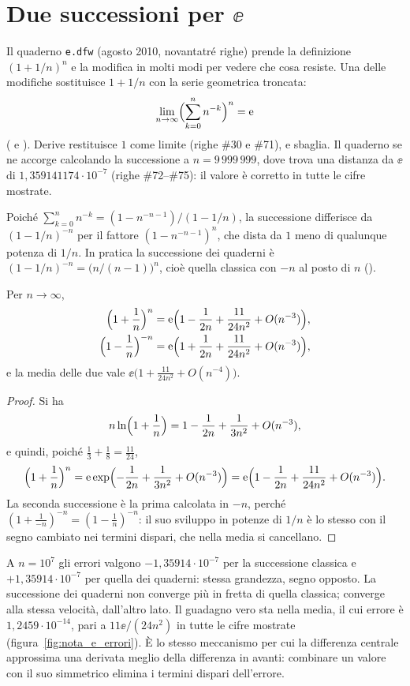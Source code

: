 \section{Due successioni per \texorpdfstring{$\ee$}{e}}
\label{sec:e}

Il quaderno \texttt{e.dfw} (agosto 2010, novantatr\'e righe) prende la
definizione $(1+1/n)^n$ e la modifica in molti modi per vedere che cosa
resiste. Una delle modifiche sostituisce $1+1/n$ con la serie geometrica
troncata:
\[
  \lim_{n\to\infty}\Bigl(\sum_{k=0}^{n}n^{-k}\Bigr)^{n}=\mathrm{e}
\]
( e ). Derive restituisce $1$ come
limite (righe \#30 e \#71), e sbaglia. Il quaderno se ne accorge calcolando
la successione a $n=9\,999\,999$, dove trova una distanza da $\ee$ di
$1{,}359141174\cdot10^{-7}$ (righe \#72--\#75): il valore \`e corretto in
tutte le cifre mostrate.

Poich\'e $\sum_{k=0}^{n}n^{-k}=(1-n^{-n-1})/(1-1/n)$, la successione differisce
da $(1-1/n)^{-n}$ per il fattore $(1-n^{-n-1})^n$, che dista da $1$ meno di
qualunque potenza di $1/n$. In pratica la successione dei quaderni \`e
$(1-1/n)^{-n}=\bigl(n/(n-1)\bigr)^n$, cio\`e quella classica con $-n$ al posto
di $n$ ().

\begin{prop}\label{prop:e}
Per $n\to\infty$,
\begin{align*}
  \Bigl(1+\frac1n\Bigr)^{n}&=\mathrm{e}\Bigl(1-\frac{1}{2n}+\frac{11}{24n^2}+O(n^{-3})\Bigr),\\
  \Bigl(1-\frac1n\Bigr)^{-n}&=\mathrm{e}\Bigl(1+\frac{1}{2n}+\frac{11}{24n^2}+O(n^{-3})\Bigr),
\end{align*}
e la media delle due vale $\ee\bigl(1+\frac{11}{24n^2}+O(n^{-4})\bigr)$.
\end{prop}

\begin{proof}
Si ha
\[
  n\ln\Bigl(1+\frac1n\Bigr)=1-\frac{1}{2n}+\frac{1}{3n^2}+O(n^{-3}),
\]
e quindi, poich\'e $\frac13+\frac18=\frac{11}{24}$,
\[
  \Bigl(1+\frac1n\Bigr)^{n}=\mathrm{e}\exp\Bigl(-\frac1{2n}+\frac1{3n^2}+O(n^{-3})\Bigr)
  =\mathrm{e}\Bigl(1-\frac1{2n}+\frac{11}{24n^2}+O(n^{-3})\Bigr).
\]
La seconda successione \`e la prima calcolata in $-n$, perch\'e
$(1+\frac{1}{-n})^{-n}=(1-\frac1n)^{-n}$: il suo sviluppo in potenze di $1/n$
\`e lo stesso con il segno cambiato nei termini dispari, che nella media si
cancellano.
\end{proof}

A $n=10^7$ gli errori valgono $-1{,}35914\cdot10^{-7}$ per la successione
classica e $+1{,}35914\cdot10^{-7}$ per quella dei quaderni: stessa grandezza,
segno opposto. La successione dei quaderni non converge pi\`u in fretta di
quella classica; converge alla stessa velocit\`a, dall'altro lato. Il
guadagno vero sta nella media, il cui errore \`e $1{,}2459\cdot10^{-14}$,
pari a $11\ee/(24n^2)$ in tutte le cifre mostrate
(figura~\ref{fig:nota_e_errori}). \`E lo stesso meccanismo per cui la
differenza centrale approssima una derivata meglio della differenza in
avanti: combinare un valore con il suo simmetrico elimina i termini dispari
dell'errore.


